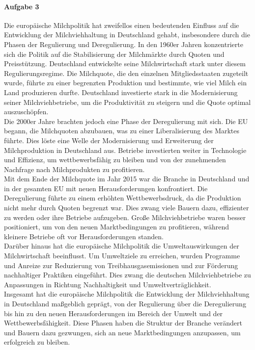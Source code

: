 \documentclass[11pt,a4paper]{report}
\begin{document}
	\paragraph{Aufgabe 3}
	Die europäische Milchpolitik hat zweifellos einen bedeutenden Einfluss auf die Entwicklung der Milchviehhaltung in Deutschland gehabt, insbesondere durch die Phasen der Regulierung und Deregulierung.
	In den 1960er Jahren konzentrierte sich die Politik auf die Stabilisierung der Milchmärkte durch Quoten und Preisstützung.
	Deutschland entwickelte seine Milchwirtschaft stark unter diesem Regulierungsregime.
	Die Milchquote, die den einzelnen Mitgliedsstaaten zugeteilt wurde, führte zu einer begrenzten Produktion und bestimmte, wie viel Milch ein Land produzieren durfte.
	Deutschland investierte stark in die Modernisierung seiner Milchviehbetriebe, um die Produktivität zu steigern und die Quote optimal auszuschöpfen. \\
	Die 2000er Jahre brachten jedoch eine Phase der Deregulierung mit sich.
	Die EU begann, die Milchquoten abzubauen, was zu einer Liberalisierung des Marktes führte.
	Dies löste eine Welle der Modernisierung und Erweiterung der Milchproduktion in Deutschland aus.
	Betriebe investierten weiter in Technologie und Effizienz, um wettbewerbsfähig zu bleiben und von der zunehmenden Nachfrage nach Milchprodukten zu profitieren. \\
	Mit dem Ende der Milchquote im Jahr 2015 war die Branche in Deutschland und in der gesamten EU mit neuen Herausforderungen konfrontiert.
	Die Deregulierung führte zu einem erhöhten Wettbewerbsdruck, da die Produktion nicht mehr durch Quoten begrenzt war.
	Dies zwang viele Bauern dazu, effizienter zu werden oder ihre Betriebe aufzugeben. Große Milchviehbetriebe waren besser positioniert, um von den neuen Marktbedingungen zu profitieren, während kleinere Betriebe oft vor Herausforderungen standen. \\
	Darüber hinaus hat die europäische Milchpolitik die Umweltauswirkungen der Milchwirtschaft beeinflusst.
	Um Umweltziele zu erreichen, wurden Programme und Anreize zur Reduzierung von Treibhausgasemissionen und zur Förderung nachhaltiger Praktiken eingeführt.
	Dies zwang die deutschen Milchviehbetriebe zu Anpassungen in Richtung Nachhaltigkeit und Umweltverträglichkeit. \\
	Insgesamt hat die europäische Milchpolitik die Entwicklung der Milchviehhaltung in Deutschland maßgeblich geprägt, von der Regulierung über die Deregulierung bis hin zu den neuen Herausforderungen im Bereich der Umwelt und der Wettbewerbsfähigkeit.
	Diese Phasen haben die Struktur der Branche verändert und Bauern dazu gezwungen, sich an neue Marktbedingungen anzupassen, um erfolgreich zu bleiben.
\end{document}

